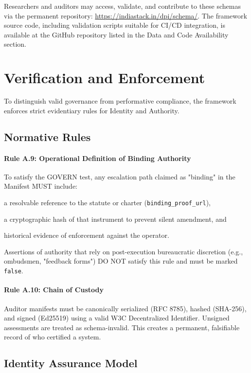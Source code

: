 \documentclass{article}
\begin{document}
Researchers and auditors may access, validate, and contribute to these schemas via the permanent repository: \url{https://indiastack.in/dpi/schema/}. The framework source code, including validation scripts suitable for CI/CD integration, is available at the GitHub repository listed in the Data and Code Availability section.

\section{Verification and Enforcement}
\label{appendix:rules}

To distinguish valid governance from performative compliance, the framework enforces strict evidentiary rules for Identity and Authority.

\subsection{Normative Rules}

\paragraph{Rule A.9: Operational Definition of Binding Authority}
To satisfy the GOVERN test, any escalation path claimed as "binding" in the Manifest MUST include:
\begin{enumerate*}[label=(\roman*)]
    \item a resolvable reference to the statute or charter (\texttt{binding\_proof\_url}),
    \item a cryptographic hash of that instrument to prevent silent amendment, and
    \item historical evidence of enforcement against the operator.
\end{enumerate*}
Assertions of authority that rely on post-execution bureaucratic discretion (e.g., ombudsmen, "feedback forms") DO NOT satisfy this rule and must be marked \texttt{false}.

\paragraph{Rule A.10: Chain of Custody}
Auditor manifests must be canonically serialized (RFC 8785), hashed (SHA-256), and signed (Ed25519) using a valid W3C Decentralized Identifier. Unsigned assessments are treated as schema-invalid. This creates a permanent, falsifiable record of who certified a system.

\subsection{Identity Assurance Model}
\end{document}

